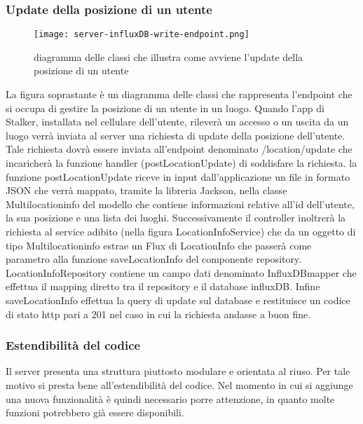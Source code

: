 \documentclass[../../manuale-manutentore.tex]{subfiles}
\begin{document}
\subsubsection{Update della posizione di un utente}%
\label{subs:update_della_posizione_di_un_utente}

  \begin{figure}[H]
    \centering
    \texttt{[image: server-influxDB-write-endpoint.png]}
    \caption{diagramma delle classi che illustra come avviene l'update della posizione di un utente}%
     \label{fig:diagramma delle classi che illustra come avviene l'update della posizione di un}
  \end{figure}

  La figura soprastante è un diagramma delle classi che rappresenta l'endpoint che si occupa di gestire la posizione di un utente in un luogo.
  Quando l'app di Stalker, installata nel cellulare dell'utente, rileverà un accesso o un uscita da un luogo verrà inviata al server una richiesta di update della posizione dell'utente.
  Tale richiesta dovrà essere inviata all'endpoint denominato /location/update che incaricherà la funzione handler (postLocationUpdate) di soddisfare la richiesta.
  la funzione postLocationUpdate riceve in input dall'applicazione un file in formato JSON che verrà mappato, tramite la libreria Jackson, nella classe Multilocationinfo del modello che contiene informazioni relative all'id dell'utente, la sua posizione e una lista dei luoghi.
  Successivamente il controller inoltrerà la richiesta al service adibito (nella figura LocationInfoService) che da un oggetto di tipo Multilocationinfo estrae un Flux di LocationInfo che passerà come parametro alla funzione saveLocationInfo del componente repository.
  LocationInfoRepository contiene un campo dati denominato InfluxDBmapper che effettua il mapping diretto tra il repository e il database influxDB\@. Infine saveLocationInfo effettua la query di update sul database e restituisce un codice di stato http pari a 201 nel caso in cui la richiesta andasse a buon fine.

\subsubsection{Estendibilità del codice}%
\label{subs:estendibilita_del_codice}

Il server presenta una struttura piuttosto modulare e orientata al riuso.
Per tale motivo si presta bene all'estendibilità del codice.
Nel momento in cui si aggiunge una nuova funzionalità è quindi necessario porre attenzione, in quanto molte funzioni potrebbero già essere disponibili.
\end{document}
